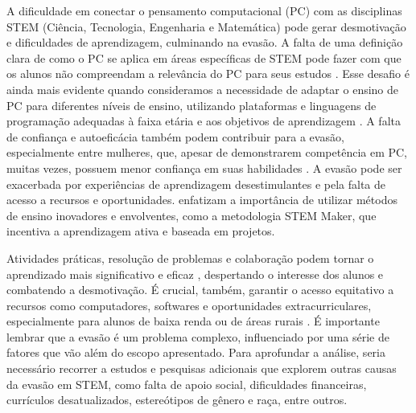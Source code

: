 \documentclass[manuscript,screen,review]{acmart}
\begin{document}
A dificuldade em conectar o pensamento computacional (PC) com as disciplinas STEM (Ciência, Tecnologia, Engenharia e Matemática) pode gerar desmotivação e dificuldades de aprendizagem, culminando na evasão. A falta de uma definição clara de como o PC se aplica em áreas específicas de STEM pode fazer com que os alunos não compreendam a relevância do PC para seus estudos \cite{Integrating}. Esse desafio é ainda mais evidente quando consideramos a necessidade de adaptar o ensino de PC para diferentes níveis de ensino, utilizando plataformas e linguagens de programação adequadas à faixa etária e aos objetivos de aprendizagem \cite{Analysis, Integrating}. A falta de confiança e autoeficácia também podem contribuir para a evasão, especialmente entre mulheres, que, apesar de demonstrarem competência em PC, muitas vezes, possuem menor confiança em suas habilidades \cite{Integrating}. A evasão pode ser exacerbada por experiências de aprendizagem desestimulantes e pela falta de acesso a recursos e oportunidades. \citet{Integrating,Assessing,Analysis,Measurement} enfatizam a importância de utilizar métodos de ensino inovadores e envolventes, como a metodologia STEM Maker, que incentiva a aprendizagem ativa e baseada em projetos. 

Atividades práticas, resolução de problemas e colaboração podem tornar o aprendizado mais significativo e eficaz \cite{Integrating,Assessing,Measurement,Preparing}, despertando o interesse dos alunos e combatendo a desmotivação. É crucial, também, garantir o acesso equitativo a recursos como computadores, softwares e oportunidades extracurriculares, especialmente para alunos de baixa renda ou de áreas rurais \cite{Preparing}.
É importante lembrar que a evasão é um problema complexo, influenciado por uma série de fatores que vão além do escopo apresentado. Para aprofundar a análise, seria necessário recorrer a estudos e pesquisas adicionais que explorem outras causas da evasão em STEM, como falta de apoio social, dificuldades financeiras, currículos desatualizados, estereótipos de gênero e raça, entre outros. 
\end{document}
